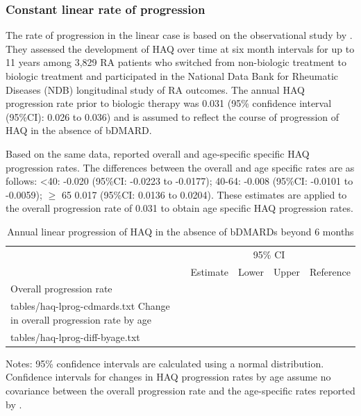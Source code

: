 \documentclass[11pt,final,fleqn]{article}\usepackage[]{graphicx}\usepackage[]{color}
\makeatletter
\theoremstyle{plain}
\newcommand*\ExpandableInput[1]{\@@input#1 }
\makeatother
\begin{document}
\subsubsection{Constant linear rate of progression} \label{sec:haq-linear-rate}
The rate of progression in the linear case is based on the observational study by \citet{wolfe2010loss}. They assessed the development of HAQ over time at six month intervals for up to 11 years among 3,829 RA patients who switched from non-biologic treatment to biologic treatment and participated in the National Data Bank for Rheumatic Diseases (NDB) longitudinal study of RA outcomes. The annual HAQ progression rate prior to biologic therapy was 0.031 (95\% confidence interval (95\%CI): 0.026 to 0.036) and is assumed to reflect the course of progression of HAQ in the absence of bDMARD.

Based on the same data, \citet{michaud2011treatment} reported overall and age-specific specific HAQ progression rates. The differences between the overall and age specific rates are as follows: \textless{}40: -0.020 (95\%CI: -0.0223 to -0.0177); 40-64: -0.008 (95\%CI: -0.0101 to -0.0059); \(\geq\) 65 0.017 (95\%CI: 0.0136 to 0.0204). These estimates are applied to the overall progression rate of 0.031 to obtain age specific HAQ progression rates.



\begin{table}[!ht]
\begin{center}
\begin{threeparttable}
\caption{Annual linear progression of HAQ in the absence of bDMARDs beyond 6 months} \label{tbl:haq-lprog}
\footnotesize
\begin{tabularx}{\textwidth}{@{\extracolsep{\fill}}lrrrl}
\hline
\multicolumn{2}{l}{} & \multicolumn{2}{c}{95\% CI} & \multicolumn{1}{l}{} \\
\cmidrule{3-4} 
\multicolumn{1}{l}{} & \multicolumn{1}{r}{Estimate} & \multicolumn{1}{r}{Lower} & \multicolumn{1}{r}{Upper} & \multicolumn{1}{l}{Reference} \\
\hline
Overall progression rate \\
\ExpandableInput{tables/haq-lprog-cdmards.txt}
Change in overall progression rate by age \\
\ExpandableInput{tables/haq-lprog-diff-byage.txt}
\hline
\end{tabularx}
\scriptsize
Notes: 95\% confidence intervals are calculated using a normal distribution. Confidence intervals for changes in HAQ progression rates by age assume no covariance between the overall progression rate and the age-specific rates reported by \citet{michaud2011treatment}.
\end{threeparttable}
\end{center}
\end{table}
\end{document}
